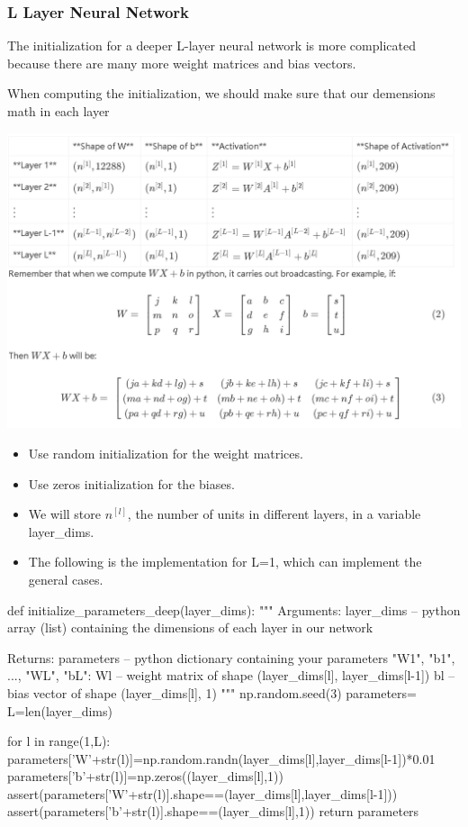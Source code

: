 \documentclass[12pt,a4paper]{article}
\begin{document}
		\subsubsection{L Layer Neural Network}
			The initialization for a deeper L-layer neural network is more complicated because there are many more weight matrices and bias vectors.\par
			When computing the initialization, we should make sure that our demensions math in each layer\par
			\includegraphics[scale=0.7]{image_2.png}
			\begin{itemize}
				\item Use random initialization for the weight matrices.
				\item Use zeros initialization for the biases.
				\item We will store $n^{[l]}$, the number of units in different layers, in a variable layer\_dims. 
				\item The following  is the implementation for L=1, which can implement the general cases.
			\end{itemize}
		\newpage
			\begin{python}
				def initialize_parameters_deep(layer_dims):
				"""
				Arguments:
				layer_dims -- python array (list) containing the dimensions of each layer in our network
				
				Returns:
				parameters -- python dictionary containing your parameters "W1", "b1", ..., "WL", "bL":
				Wl -- weight matrix of shape (layer_dims[l], layer_dims[l-1])
				bl -- bias vector of shape (layer_dims[l], 1)
				"""
				np.random.seed(3)
				parameters={}
				L=len(layer_dims)
				
				for l in range(1,L):
				parameters['W'+str(l)]=np.random.randn(layer_dims[l],layer_dims[l-1])*0.01
				parameters['b'+str(l)]=np.zeros((layer_dims[l],1))
				assert(parameters['W'+str(l)].shape==(layer_dims[l],layer_dims[l-1]))
				assert(parameters['b'+str(l)].shape==(layer_dims[l],1))
				return parameters
			\end{python}
			\newpage
\end{document}
